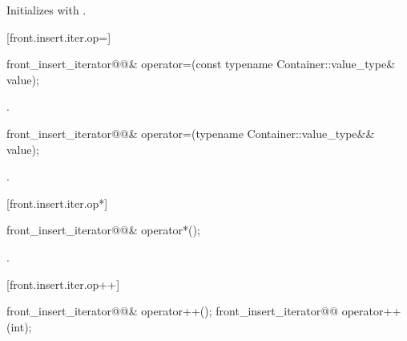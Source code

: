 \begin{itemdescr}
\pnum
\effects
Initializes
with .
\end{itemdescr}

[front.insert.iter.op=]{}

%
\begin{itemdecl}
front_insert_iterator@@&
  operator=(const typename Container::value_type& value);
\end{itemdecl}

\begin{itemdescr}
\pnum
\effects {}

\pnum
\returns
{}.
\end{itemdescr}

%
\begin{itemdecl}
front_insert_iterator@@&
  operator=(typename Container::value_type&& value);
\end{itemdecl}

\begin{itemdescr}
\pnum
\effects {}

\pnum
\returns
{}.
\end{itemdescr}

[front.insert.iter.op*]{}

%
\begin{itemdecl}
front_insert_iterator@@& operator*();
\end{itemdecl}

\begin{itemdescr}
\pnum
\returns
{}.
\end{itemdescr}

[front.insert.iter.op++]{}

%
\begin{itemdecl}
front_insert_iterator@@& operator++();
front_insert_iterator@@ operator++(int);
\end{itemdecl}

